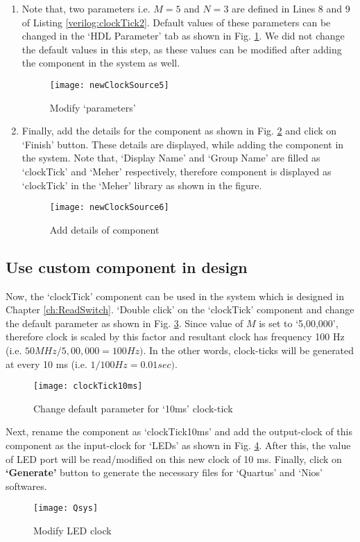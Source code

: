 \begin{enumerate}
	\item Note that, two parameters i.e. $M = 5$ and $N = 3$ are defined in Lines 8 and 9 of Listing \ref{verilog:clockTick2}. Default values of these parameters can be changed in the `HDL Parameter' tab as shown in Fig. \ref{fig:newClockSource5}. We did not change the default values in this step, as these values can be modified after adding the component in the system as well.
	\begin{figure}[!h]
		\centering
		\texttt{[image: newClockSource5]}
		\caption{Modify `parameters'}
		\label{fig:newClockSource5}
	\end{figure} 
	
	\item Finally, add the details for the component as shown in Fig. \ref{fig:newClockSource6} and click on `Finish' button. These details are displayed, while adding the component in the system. Note that, `Display Name' and `Group Name' are filled as `clockTick' and `Meher' respectively, therefore component is displayed as `clockTick' in the `Meher' library as shown in the figure.
	\begin{figure}[!h]
		\centering
		\texttt{[image: newClockSource6]}
		\caption{Add details of component}
		\label{fig:newClockSource6}
	\end{figure}
\end{enumerate}

\subsection{Use custom component in design}
Now, the `clockTick' component can be used in the system which is designed in Chapter \ref{ch:ReadSwitch}. `Double click' on the `clockTick' component and change the default parameter as shown in Fig. \ref{fig:clockTick10ms}. Since value of $M$ is set to `5,00,000', therefore clock is scaled by this factor and resultant clock has frequency 100 Hz (i.e. $50MHz/5,00,000 = 100 Hz)$. In the other words, clock-ticks will be generated at every 10 ms (i.e. $1/100Hz = 0.01 sec)$. 
\begin{figure}[!h]
	\centering
	\texttt{[image: clockTick10ms]}
	\caption{Change default parameter for `10ms' clock-tick}
	\label{fig:clockTick10ms}
\end{figure}

Next, rename the component as `clockTick10ms' and add the output-clock of this component as the input-clock for `LEDs' as shown in Fig. \ref{fig:Qsys}. After this, the value of LED port will be read/modified on this new clock of 10 ms. Finally, click on \textbf{`Generate'} button to generate the necessary files for `Quartus' and `Nios' softwares. 
\begin{figure}[!h]
	\centering
	\texttt{[image: Qsys]}
	\caption{Modify LED clock}
	\label{fig:Qsys}
\end{figure}

